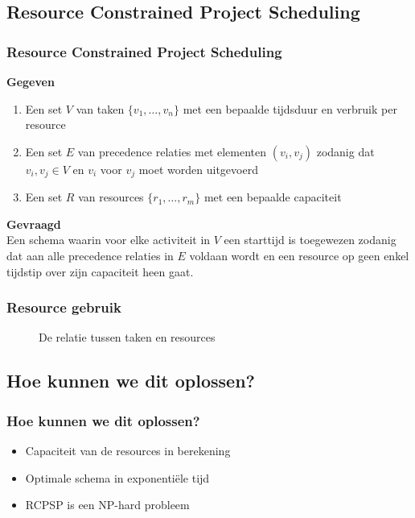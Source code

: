 \documentclass{beamer}
\theoremstyle{definition}
\newcommand{\inputtikz}[1]{}
\begin{document}
\subsection{Resource Constrained Project Scheduling}
\begin{frame}
	\frametitle{Resource Constrained Project Scheduling}
	\textbf{Gegeven}
	\begin{enumerate}
		\item Een set $V$ van taken $\{v_1,\dots,v_n\}$ met een bepaalde tijdsduur en verbruik per resource
		\item Een set $E$ van precedence relaties met elementen $(v_i, v_j)$ zodanig dat $v_i, v_j \in V$ en $v_i$ voor $v_j$ moet worden uitgevoerd
		\item Een set $R$ van resources $\{r_1, \ldots, r_m\}$ met een bepaalde capaciteit
	\end{enumerate}
	
	\textbf{Gevraagd}\\
	Een schema waarin voor elke activiteit in $V$ een starttijd is toegewezen zodanig dat aan alle precedence relaties in $E$ voldaan wordt en een resource op geen enkel tijdstip over zijn capaciteit heen gaat.
\end{frame}

\begin{frame}
	\frametitle{Resource gebruik}
	\vspace{-.2em}
	\begin{figure}[ht]
		\makebox[\textwidth][c]{\resizebox{.7\paperwidth}{!}{
			\inputtikz{usage_nl}
		}}
		\vspace{-1em}
		\caption{De relatie tussen taken en resources}
		\label{fig:activity_graph}
	\end{figure}
\end{frame}


\subsection{Hoe kunnen we dit oplossen?}
\begin{frame}
	\frametitle{Hoe kunnen we dit oplossen?}
	\begin{itemize}
		\item Capaciteit van de resources in berekening
		\item Optimale schema in exponenti\"{e}le tijd
		\item RCPSP is een NP-hard probleem
	\end{itemize}
\end{frame}
\end{document}
